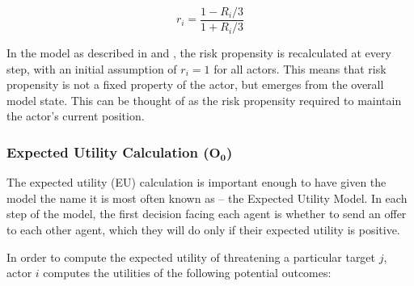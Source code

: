 \begin{equation}
    r_i = \frac{1 - R_i/3}{1 + R_i/3}
\end{equation}

In the model as described in \citet{bdm_2002} and \citet{scholz_2011}, the risk propensity is recalculated at every step, with an initial assumption of $r_i=1$ for all actors. This means that risk propensity is not a fixed property of the actor, but emerges from the overall model state. This can be thought of as the risk propensity required to maintain the actor's current position.

\subsubsection{Expected Utility Calculation ($\mathbf{O_0}$)} \label{eu_calc}

The expected utility (EU) calculation is important enough to have given the model the name it is most often known as -- the Expected Utility Model. In each step of the model, the first decision facing each agent is whether to send an offer to each other agent, which they will do only if their expected utility is positive.

In order to compute the expected utility of threatening a particular target $j$, actor $i$ computes the utilities of the following potential outcomes:

